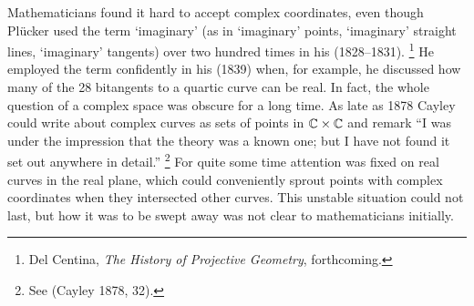 Mathematicians found it hard to accept complex coordinates, even
though Pl\"ucker used the term `imaginary' (as in `imaginary' points,
`imaginary' straight lines, `imaginary' tangents) over two hundred
times in his (1828--1831).%
%
\footnote{Del Centina, \emph{The History of Projective Geometry},
%
forthcoming.}
%
He employed the term
confidently in his (1839) when, for example, he discussed how many of
the 28 bitangents to a quartic curve can be real. In fact, the whole
question of a complex space was obscure for a long time. As late as
1878 Cayley
%
could write about complex curves as sets of points in
$\CC \times \CC$ and remark ``I was under the impression that the
theory was a known one; but I have not found it set out anywhere in
detail.''%
%
\footnote{See (Cayley 1878, 32).} 
%
For quite some time
attention was fixed on real curves in the real plane, which could
conveniently sprout points with complex coordinates when they
intersected other curves. This unstable situation could not last, but
how it was to be swept away was not clear to mathematicians initially.


